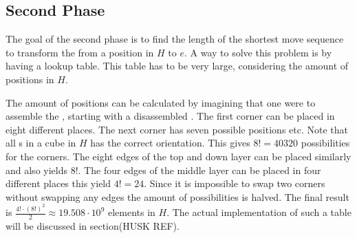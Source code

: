 \subsection{Second Phase}
\label{sub:secondPhase}
The goal of the second phase is to find the length of the shortest move sequence to transform the \rubik{} from a position in $H$ to $e$. A way to solve this problem is by having a lookup table. This table has to be very large, considering the amount of positions in $H$. 

The amount of positions can be calculated by imagining that one were to assemble the \rubik{}, starting with a disassembled \rubik{}. The first corner \cpiece{} can be placed in eight different places. The next corner has seven possible positions etc. Note that all \cpiece{}s in a cube in $H$ has the correct orientation. 
This gives $8! = 40320$ possibilities for the corners. 
The eight edges of the top and down layer can be placed similarly and also yields $8!$.  
The four edges of the middle layer can be placed in four different places this yield $4! = 24$. Since it is impossible to swap two corners without swapping any edges the amount of possibilities is halved. 
The final result is $\frac{4!\cdot(8!)^{2}}{2} \approx 19.508\cdot10^{9}$ elements in $H$.
The actual implementation of such a table will be discussed in section(HUSK REF). 

 